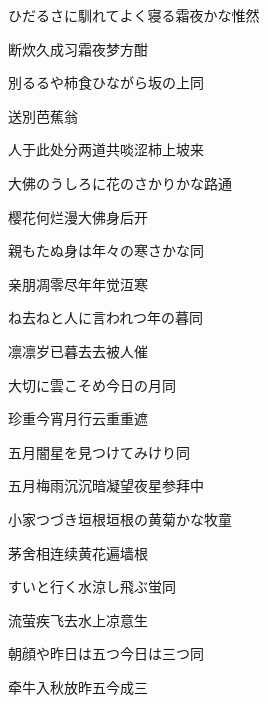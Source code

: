 \begin{haiku}
    {\FH ひだるさに馴れてよく寝る霜夜かな}\hfill{\FH 惟然}

    {\FK 断炊久成习霜夜梦方酣}
\end{haiku}

\begin{haiku}
    {\FH 別るるや柿食ひながら坂の上}\hfill{\FH 同}

    {\FK 送別芭蕉翁}

    {\FK 人于此处分两道共啖涩柿上坡来}
\end{haiku}

\begin{haiku}
    {\FH 大佛のうしろに花のさかりかな}\hfill{\FH 路通}

    {\FK 樱花何烂漫大佛身后开}
\end{haiku}

\begin{haiku}
    {\FH 親もたぬ身は年々の寒さかな}\hfill{\FH 同}

    {\FK 亲朋凋零尽年年觉沍寒}
\end{haiku}

\begin{haiku}
    {\FH {}ね去ねと人に言われつ年の暮}\hfill{\FH 同}

    {\FK 凛凛岁已暮去去被人催}
\end{haiku}

\begin{haiku}
    {\FH 大切に雲こそめ今日の月}\hfill{\FH 同}

    {\FK 珍重今宵月行云重重遮}
\end{haiku}

\begin{haiku}
    {\FH 五月闇星を見つけてみけり}\hfill{\FH 同}

    {\FK 五月梅雨沉沉暗凝望夜星参拜中}
\end{haiku}

\begin{haiku}
    {\FH 小家つづき垣根垣根の黄菊かな}\hfill{\FH 牧童}

    {\FK 茅舍相连续黄花遍墙根}
\end{haiku}

\begin{haiku}
    {\FH すいと行く水涼し飛ぶ蛍}\hfill{\FH 同}

    {\FK 流萤疾飞去水上凉意生}
\end{haiku}

\begin{haiku}
    {\FH 朝顔や昨日は五つ今日は三つ}\hfill{\FH 同}

    {\FK 牵牛入秋放昨五今成三}
\end{haiku}

